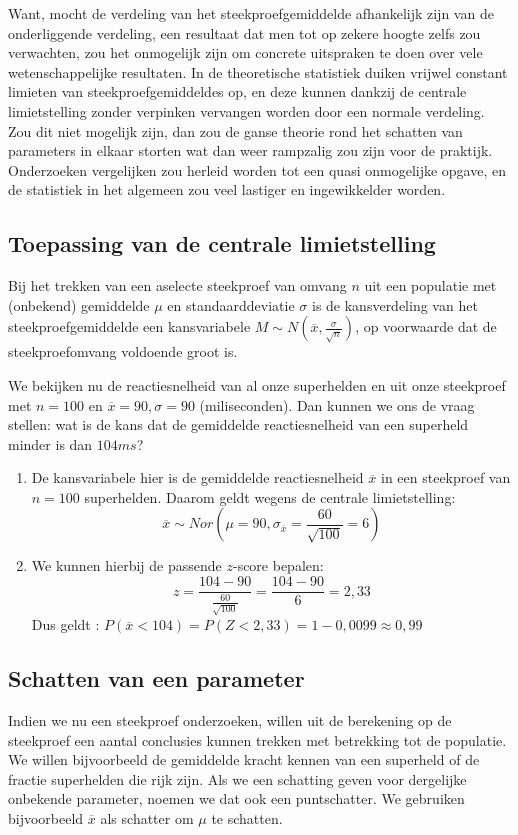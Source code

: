 {Want, mocht de verdeling van het steekproefgemiddelde afhankelijk zijn van de onderliggende verdeling, een resultaat dat men tot op zekere hoogte zelfs zou verwachten, zou het onmogelijk zijn om concrete uitspraken te doen over vele wetenschappelijke resultaten. In de theoretische statistiek duiken vrijwel constant limieten van steekproefgemiddeldes op, en deze kunnen dankzij de centrale limietstelling zonder verpinken vervangen worden door een normale verdeling. Zou dit niet mogelijk zijn, dan zou de ganse theorie rond het schatten van parameters in elkaar storten wat dan weer rampzalig zou zijn voor de praktijk. Onderzoeken vergelijken zou herleid worden tot een quasi onmogelijke opgave, en de statistiek in het algemeen zou veel lastiger en ingewikkelder worden.

\subsection{Toepassing van de centrale limietstelling}
Bij het trekken van een aselecte steekproef van omvang $n$ uit een populatie met (onbekend) gemiddelde $\mu$ en standaarddeviatie $\sigma$ is de kansverdeling van het steekproefgemiddelde een kansvariabele $M \sim N (\overline{x}, \frac{\sigma}{\sqrt{n}})$, op voorwaarde dat de steekproefomvang voldoende groot is.

\begin{example}
  We bekijken nu de reactiesnelheid van al onze superhelden en uit onze steekproef met $n = 100$ en $\overline{x} = 90, \sigma = 90$ (miliseconden). Dan kunnen we ons de vraag stellen: wat is de kans dat de gemiddelde reactiesnelheid van een superheld minder is dan $104 ms$?


  \begin{enumerate}
    \item De kansvariabele hier is de gemiddelde reactiesnelheid $\overline{x}$ in een steekproef van $n=100$ superhelden. Daarom geldt wegens de centrale limietstelling:
    \[ \overline{x} \sim Nor(\mu = 90, \sigma_{\overline{x}} = \frac{60}{\sqrt{100}} = 6) \]
    \item We kunnen hierbij de passende $z$-score bepalen:
    \[ z = \frac{104-90}{\frac{60}{\sqrt{100}}} = \frac{104-90}{6} = 2,33 \]
    Dus geldt : $P(\overline{x} < 104) = P(Z < 2,33) = 1 - 0,0099 \approx 0,99$
  \end{enumerate}
\end{example}

\subsection{Schatten van een parameter}
Indien we nu een steekproef onderzoeken, willen uit de berekening op de steekproef een aantal conclusies kunnen trekken met betrekking tot de populatie. We willen bijvoorbeeld de gemiddelde kracht kennen van een superheld of de fractie superhelden die rijk zijn. Als we een schatting geven voor dergelijke onbekende parameter, noemen we dat ook een puntschatter. We gebruiken bijvoorbeeld $\overline{x}$ als schatter om $\mu$ te schatten.

}
